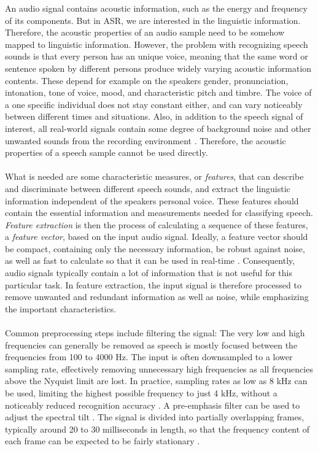 \documentclass[english, 12pt, a4paper, pdftex, elec, utf8]{aaltothesis}
\begin{document}
An audio signal contains acoustic information, such as the energy and frequency of its components. But in ASR, we are interested in the linguistic information. Therefore, the acoustic properties of an audio sample need to be somehow mapped to linguistic information. However, the problem with recognizing speech sounds is that every person has an unique voice, meaning that the same word or sentence spoken by different persons produce widely varying acoustic information contents. These depend for example on the speakers gender, pronunciation, intonation, tone of voice, mood, and characteristic pitch and timbre. The voice of a one specific individual does not stay constant either, and can vary noticeably between different times and situations. Also, in addition to the speech signal of interest, all real-world signals contain some degree of background noise and other unwanted sounds from the recording environment \cite{huang2001spoken}. Therefore, the acoustic properties of a speech sample cannot be used directly. \\\\
What is needed are some characteristic measures, or \textit{features}, that can describe and discriminate between different speech sounds, and extract the linguistic information independent of the speakers personal voice. These features should contain the essential information and measurements needed for classifying speech. \textit{Feature extraction} is then the process of calculating a sequence of these features, a \textit{feature vector}, based on the input audio signal. Ideally, a feature vector should be compact, containing only the necessary information, be robust against noise, as well as fast to calculate so that it can be used in real-time \cite{huang2001spoken}. Consequently, audio signals typically contain a lot of information that is not useful for this particular task. In feature extraction, the input signal is therefore processed to remove unwanted and redundant information as well as noise, while emphasizing the important characteristics. \\\\
Common preprocessing steps include filtering the signal: The very low and high frequencies can generally be removed as speech is mostly focused between the frequencies from 100 to 4000 Hz. The input is often downsampled to a lower sampling rate, effectively removing unnecessary high frequencies as all frequencies above the Nyquist limit are lost. In practice, sampling rates as low as 8 kHz can be used, limiting the highest possible frequency to just 4 kHz, without a noticeably reduced recognition accuracy \cite{huang2001spoken}. A pre-emphasis filter can be used to adjust the spectral tilt \cite{kallasjoki2016}. The signal is divided into partially overlapping frames, typically around 20 to 30 milliseconds in length, so that the frequency content of each frame can be expected to be fairly stationary \cite{huang2001spoken, gales2008application}. \\\\
\end{document}
